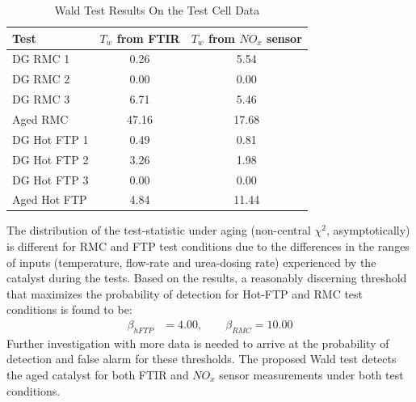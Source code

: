 \begin{table}[ht]
        \centering
        \caption{Wald Test Results On the Test Cell Data}
        \label{tab::Tw_tst}
        \begin{tabular}{l c c}
        \hline \hline
        Test & $T_w$ from FTIR & $T_w$ from $NO_x$ sensor \\\hline \hline
        DG RMC 1      & 0.26 & 5.54\\
        DG RMC 2      & 0.00 & 0.00\\
        DG RMC 3      & 6.71 & 5.46\\
        Aged RMC      & 47.16 & 17.68\\
        \hline
        DG Hot FTP 1  & 0.49 & 0.81\\
        DG Hot FTP 2  & 3.26 & 1.98\\
        DG Hot FTP 3  & 0.00 & 0.00\\
        Aged Hot FTP  & 4.84 & 11.44\\
        \hline \hline
        \end{tabular}
\end{table}
The distribution of the test-statistic under aging (non-central $\chi^2$, asymptotically) is different for RMC and FTP
test conditions due to the differences in the ranges of inputs (temperature, flow-rate and urea-dosing rate) experienced
by the catalyst during the tests. Based on the results, a reasonably discerning threshold that maximizes the probability of detection for Hot-FTP and RMC test conditions is found to be:
\begin{align}
        \beta_{hFTP} &= 4.00, \qquad \beta_{RMC} = 10.00
\end{align}
Further investigation with more data is needed to arrive at the probability of detection and false alarm for these
thresholds. The proposed Wald test detects the aged catalyst for both FTIR and $NO_x$ sensor measurements under both
test conditions.
